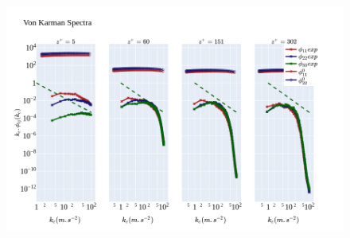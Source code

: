 \documentclass[]{article}
\theoremstyle{plain}
\theoremstyle{remark}
\begin{document}
\begin{figure}[h!]
	\begin{center}
		\includegraphics[width=\textwidth]{../output/channel_wrles_retau395/von_karman/von_karman_spectra.png}
	\end{center}
\end{figure}
	
	
\end{document}
